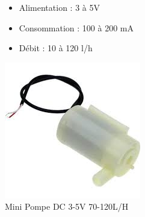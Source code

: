 \begin{flushleft}
\begin{figure}[h]
\begin{minipage}{0.6\textwidth}
				\begin{itemize}
					\item Alimentation : 3 à 5V	
					\item 				Consommation : 100 à 200 mA	
					\item 				Débit : 10 à 120 l/h
				\end{itemize}
			\end{minipage}
			\begin{minipage}{0.4\textwidth}
				\centering
				\includegraphics[width=\textwidth]{chapitres/images/pompe.jpg}
				\caption{Mini Pompe DC 3-5V 70-120L/H}
				\label{fig:votre_image}
			\end{minipage}
		\end{figure}
	
	
	\newpage
\end{flushleft}